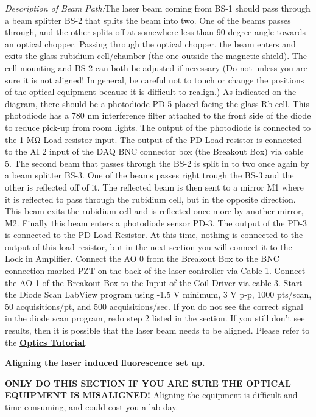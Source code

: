 \documentclass{../lab}
\begin{document}
​\emph{Description of Beam Path:}The laser beam coming from BS-1 should pass through a beam splitter BS-2 that splits the beam into two. One of the beams passes through, and the other splits off at somewhere less than 90 degree angle towards an optical chopper. Passing through the optical chopper, the beam enters and exits the glass rubidium cell/chamber (the one outside the magnetic shield). The cell mounting and BS-2 can both be adjusted if necessary (Do not unless you are sure it is not aligned! In general, be careful not to touch or change the positions of the optical equipment because it is difficult to realign.) As indicated on the diagram, there should be a photodiode PD-5 placed facing the glass Rb cell. This photodiode has a 780 nm interference filter attached to the front side of the diode to reduce pick-up from room lights. The output of the photodiode is connected to the 1 MΩ Load resistor input. The output of the PD Load resistor is connected to the AI 2 input of the DAQ BNC connector box (the Breakout Box) via cable 5. The second beam that passes through the BS-2 is split in to two once again by a beam splitter BS-3. One of the beams passes right trough the BS-3 and the other is reflected off of it. The reflected beam is then sent to a mirror M1 where it is reflected to pass through the rubidium cell, but in the opposite direction. This beam exits the rubidium cell and is reflected once more by another mirror, M2. Finally this beam enters a photodiode sensor PD-3. The output of the PD-3 is connected to the PD Load Resistor. At this time, nothing is connected to the output of this load resistor, but in the next section you will connect it to the Lock in Amplifier. Connect the AO 0 from the Breakout Box to the BNC connection marked PZT on the back of the laser controller via Cable 1. Connect the AO 1 of the Breakout Box to the Input of the Coil Driver via cable 3. Start the Diode Scan LabView program using -1.5 V minimum, 3 V p-p, 1000 pts/scan, 50 acquisitions/pt, and 500 acquisitions/sec. If you do not see the correct signal in the diode scan program, redo step 2 listed in the  section. If you still don't see results, then it is possible that the laser beam needs to be aligned. Please refer to the \href{http://experimentationlab.berkeley.edu/OpticsTutorial}{\textbf{Optics Tutorial}}.

\textbf{Aligning the laser induced fluorescence set up.}

\textbf{ONLY DO THIS SECTION IF YOU ARE SURE THE OPTICAL EQUIPMENT IS MISALIGNED!} Aligning the equipment is difficult and time consuming, and could cost you a lab day.
\end{document}
